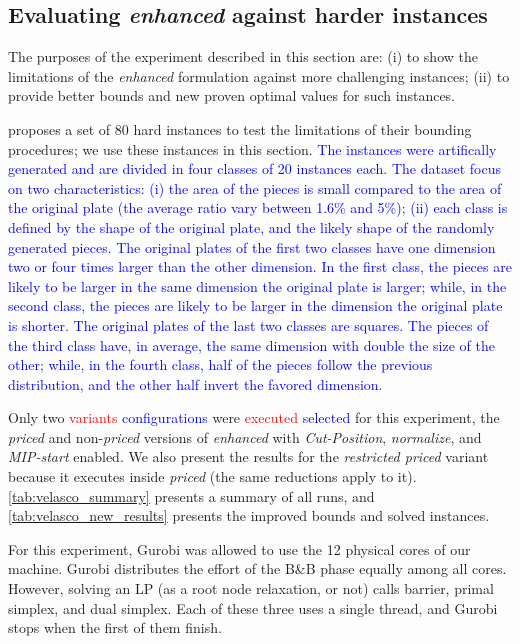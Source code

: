 \documentclass[smallextended]{svjour3}       %
\newif\iffinalversion
\newcommand{\newtext}[1]{\iffinalversion%
#1%
\else%
\textcolor{blue}{#1}%
\fi%
}
\newcommand{\oldtext}[1]{\iffinalversion%
#1%
\else%
\textcolor{red}{#1}%
\fi%
}
\begin{document}
\subsection{Evaluating \emph{enhanced} against harder instances}
\label{sec:new_results}

The purposes of the experiment described in this section are:
(i) to show the limitations of the \emph{enhanced} formulation against more challenging instances;
(ii) to provide better bounds and new proven optimal values for such instances.

\cite{velasco:2019} proposes a set of 80 hard instances to test the limitations of their bounding procedures; we use these instances in this section. \newtext{The instances were artifically generated and are divided in four classes of 20 instances each. The dataset focus on two characteristics: (i) the area of the pieces is small compared to the area of the original plate (the average ratio vary between 1.6\% and 5\%); (ii) each class is defined by the shape of the original plate, and the likely shape of the randomly generated pieces. The original plates of the first two classes have one dimension two or four times larger than the other dimension. In the first class, the pieces are likely to be larger in the same dimension the original plate is larger; while, in the second class, the pieces are likely to be larger in the dimension the original plate is shorter. The original plates of the last two classes are squares. The pieces of the third class have, in average, the same dimension with double the size of the other; while, in the fourth class, half of the pieces follow the previous distribution, and the other half invert the favored dimension.}

Only two \oldtext{variants}\newtext{configurations} were \oldtext{executed}\newtext{selected} for this experiment, the \emph{priced} and non-\emph{priced} versions of \emph{enhanced} with \emph{Cut-Position}, \emph{normalize}, and \emph{MIP-start} enabled.
We also present the results for the \emph{restricted priced} variant because it executes inside \emph{priced} (the same reductions apply to it).
\autoref{tab:velasco_summary} presents a summary of all runs, and \autoref{tab:velasco_new_results} presents the improved bounds and solved instances.

For this experiment, Gurobi was allowed to use the 12 physical cores of our machine.
Gurobi distributes the effort of the B\&B phase equally among all cores.
However, solving an LP (as a root node relaxation, or not) calls barrier, primal simplex, and dual simplex.
Each of these three uses a single thread, and Gurobi stops when the first of them finish.
\end{document}
